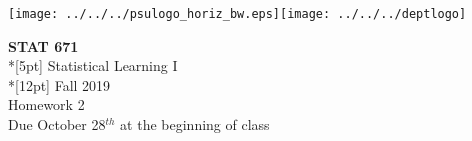 \documentclass[11pt]{article}
\begin{document}
\thispagestyle{empty}
\texttt{[image: ../../../psulogo\_horiz\_bw.eps]}\hfill\texttt{[image: ../../../deptlogo]}
\vspace{10pt}
\begin{center}
{\large\bf STAT 671}    \\*[5pt] {\Large Statistical Learning I}
\\*[12pt] {\large Fall 2019}
\\ {\large Homework 2}
\\ {\large Due October 28$^{th}$ at the beginning of class}
\end{center}
\vspace{1cm}
\noindent

\end{document}
